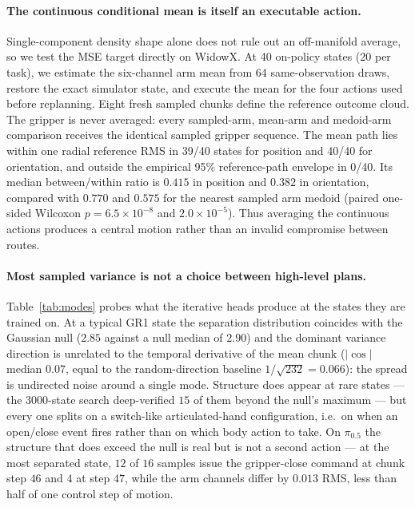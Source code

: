 \paragraph{The continuous conditional mean is itself an executable action.}
Single-component density shape alone does not rule out an off-manifold average,
so we test the MSE target directly on WidowX. At 40 on-policy states (20 per
task), we estimate the six-channel arm mean from 64 same-observation draws,
restore the exact simulator state, and execute the mean for the four actions
used before replanning. Eight fresh sampled chunks define the reference outcome
cloud. The gripper is never averaged: every sampled-arm, mean-arm and
medoid-arm comparison receives the identical sampled gripper sequence. The
mean path lies within one radial reference RMS in 39/40 states for position and
40/40 for orientation, and outside the empirical 95\% reference-path envelope
in 0/40. Its median between/within ratio is $0.415$ in position and $0.382$ in
orientation, compared with $0.770$ and $0.575$ for the nearest sampled arm
medoid (paired one-sided Wilcoxon $p=6.5\times10^{-8}$ and
$2.0\times10^{-5}$). Thus averaging the continuous actions produces a central
motion rather than an invalid compromise between routes.

\paragraph{Most sampled variance is not a choice between high-level plans.}
Table~\ref{tab:modes} probes what the iterative heads produce at the
states they are trained on. At a typical GR1 state the separation
distribution coincides with the Gaussian null ($2.85$ against a null median of
$2.90$) and the dominant variance direction is unrelated to the temporal
derivative of the mean chunk ($|\cos|$ median $0.07$, equal to the
random-direction baseline $1/\sqrt{232} = 0.066$): the spread is undirected
noise around a single mode. Structure does appear at rare states --- the
3000-state search deep-verified $15$ of them beyond the null's maximum --- but
every one splits on a switch-like articulated-hand configuration, i.e.\ on
when an open/close event fires rather than on which body action to take.
On $\pi_{0.5}$ the structure that does exceed the null is real but is not a
second action --- at the most separated state, $12$ of $16$ samples issue the
gripper-close command at chunk step $46$ and $4$ at step $47$, while the arm
channels differ by $0.013$ RMS, less than half of one control step of motion.

